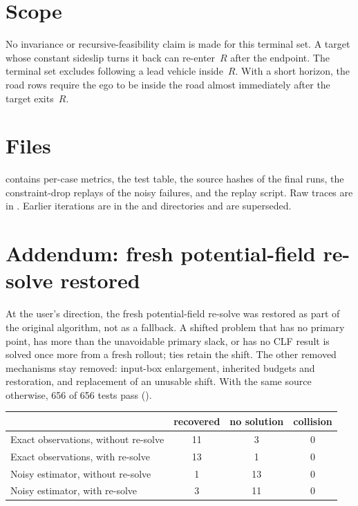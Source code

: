 \documentclass[11pt]{article}
\begin{document}
\section{Scope}
No invariance or recursive-feasibility claim is made for this terminal set. A
target whose constant sideslip turns it back can re-enter~$R$ after the endpoint.
The terminal set excludes following a lead vehicle inside~$R$. With a short
horizon, the road rows require the ego to be inside the road almost
immediately after the target exits~$R$.

\section{Files}
 contains per-case metrics, the test
table, the source hashes of the final runs, the constraint-drop replays of the
noisy failures, and the replay script. Raw traces are in
. Earlier
iterations are in the  and  directories and
are superseded.

\section{Addendum: fresh potential-field re-solve restored}
At the user's direction, the fresh potential-field re-solve was restored as part
of the original algorithm, not as a fallback. A shifted problem that has no
primary point, has more than the unavoidable primary slack, or has no CLF
result is solved once more from a fresh rollout; ties retain the shift. The
other removed mechanisms stay removed: input-box enlargement, inherited budgets
and restoration, and replacement of an unusable shift. With the same source
otherwise, 656 of 656 tests pass ().

\begin{center}
\begin{tabular}{lccc}
\toprule
 & recovered & no solution & collision\\
\midrule
Exact observations, without re-solve & 11 & 3 & 0\\
Exact observations, with re-solve & 13 & 1 & 0\\
Noisy estimator, without re-solve & 1 & 13 & 0\\
Noisy estimator, with re-solve & 3 & 11 & 0\\
\bottomrule
\end{tabular}
\end{center}
\end{document}
